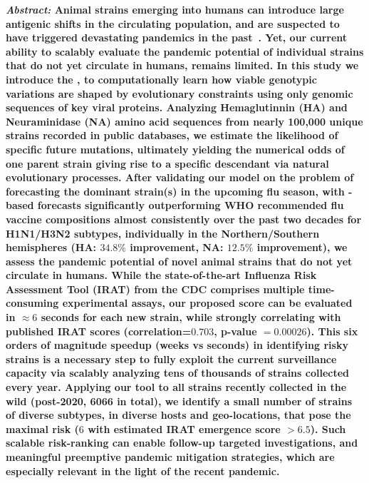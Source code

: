 \documentclass[onecolumn, compsoc,10pt]{IEEEtran}
\begin{document}
  
\maketitle

{\bf \sffamily \fontsize{10}{12}\selectfont \noindent   
  {\normalfont \itshape Abstract:} Animal \infl  strains emerging into humans can introduce large antigenic shifts in the circulating  population, and  are suspected to have triggered devastating  pandemics in the past~\cite{shao2017evolution,mills2004transmissibility,reid2003origin,landolt2007up}. Yet, our current ability to  scalably  evaluate the pandemic potential of   individual strains that do not yet circulate in humans, remains limited. In this study we introduce the \enet,  to computationally learn how viable genotypic variations are shaped by   evolutionary constraints using only genomic sequences  of key viral proteins.    Analyzing    Hemaglutinnin (HA) and Neuraminidase (NA) amino acid sequences from nearly 100,000 unique \infl  strains recorded in public  databases,  we estimate the likelihood of  specific future  mutations, ultimately  yielding the  numerical odds of one parent strain giving rise to a specific descendant via natural evolutionary processes. After validating our model on the problem of forecasting the dominant strain(s) in the upcoming flu season, with \enet-based forecasts significantly outperforming WHO recommended flu vaccine compositions almost consistently over the past two decades for  H1N1/H3N2 subtypes, individually in the Northern/Southern hemispheres (HA: $34.8\% $ improvement, NA: $12.5\%$ improvement), we assess  the pandemic potential  of novel animal  strains that do not yet circulate in humans. While the state-of-the-art  Influenza Risk Assessment Tool (IRAT) from the CDC comprises multiple time-consuming experimental assays, our proposed \erisk score can be evaluated in $\approx 6$ seconds for each new strain, while strongly correlating with published IRAT scores (correlation=$0.703$, p-value $= 0.00026$). This  six orders of magnitude speedup (weeks vs seconds) in  identifying risky strains is a necessary step to fully exploit the  current surveillance capacity via scalably analyzing tens of thousands of strains collected every year. Applying our tool to all \infl strains recently collected in the wild (post-2020, 6066 in total), we  identify a small number of strains of diverse subtypes, in diverse hosts and geo-locations, that pose the maximal risk ($6$ with estimated IRAT emergence score $> 6.5$). Such scalable risk-ranking  can   enable follow-up targeted investigations, and meaningful preemptive pandemic mitigation strategies, which are especially relevant in the light of the recent pandemic.
}
  
\end{document}
